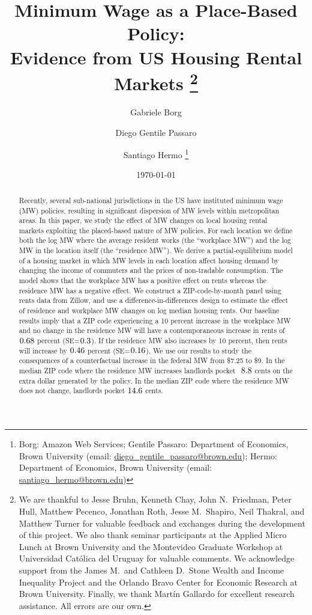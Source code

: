 \documentclass{article}
\title{ Minimum Wage as a Place-Based Policy: \\
        Evidence from US Housing Rental Markets%
        \thanks{We are thankful to Jesse Bruhn, Kenneth Chay, John N.\ Friedman, 
        Peter Hull, Matthew Pecenco, Jonathan Roth, Jesse M.\ Shapiro, 
        Neil Thakral, and Matthew Turner
        for valuable feedback and exchanges during the development of 
        this project.
        We also thank seminar participants at the Applied Micro Lunch at Brown
        University and the Montevideo Graduate Workshop at Universidad Católica 
        del Uruguay for valuable comments.
        We acknowledge support from 
        the James M.\ and Cathleen D.\ Stone 
        Wealth and Income Inequality Project and 
        the Orlando Bravo Center for Economic Research at Brown University.
        Finally, we thank Martín Gallardo for excellent research assistance.
        All errors are our own.}}
\author{Gabriele Borg \and Diego Gentile Passaro \and Santiago Hermo 
        \footnote{Borg: Amazon Web Services;
        Gentile Passaro: Department of Economics, Brown University 
        (email: \url{diego_gentile_passaro@brown.edu}); 
        Hermo: Department of Economics, Brown University 
        (email: \url{santiago_hermo@brown.edu})}}
\date{\today}
\begin{document}
\maketitle

\begin{abstract}
    \noindent
    Recently, several sub-national jurisdictions in the US have instituted 
    minimum wage (MW) policies, resulting in significant dispersion of MW levels 
    within metropolitan areas.
    In this paper, we study the effect of MW changes on local housing rental 
    markets exploiting the placed-based nature of MW policies.
    For each location we define both
    the log MW where the average resident works (the ``workplace MW'')
    and the log MW in the location itself (the ``residence MW'').
    We derive a partial-equilibrium model of a housing market
    in which MW levels in each location affect housing demand by 
    changing the income of commuters and the prices of non-tradable consumption. 
    The model shows that the workplace MW has a positive effect on rents 
    whereas the residence MW has a negative effect.
    We construct a ZIP-code-by-month panel using rents data from Zillow, and
    use a difference-in-differences design to estimate the effect of 
    residence and workplace MW changes on log median housing rents.
    Our baseline results imply that a ZIP code experiencing a 
    10 percent increase in the workplace MW and 
    no change in the residence MW will have a contemporaneous increase in rents 
    of $\textnormal{0.68}$ percent (SE=$\textnormal{0.3}$).
    If the residence MW also increases by 10 percent, then 
    rents will increase by $\textnormal{0.46}$ percent (SE=$\textnormal{0.16}$).
    We use our results to study the consequences of a counterfactual increase in 
    the federal MW from \$7.25 to \$9.
    In the median ZIP code where the residence MW increases landlords pocket 
    $\textnormal{ 8.8}$ cents on the extra dollar generated by the policy.
    In the median ZIP code where the residence MW does not change, landlords pocket 
    $\textnormal{14.6}$ cents.
\end{abstract}

\vspace{5mm}


\clearpage
\end{document}
